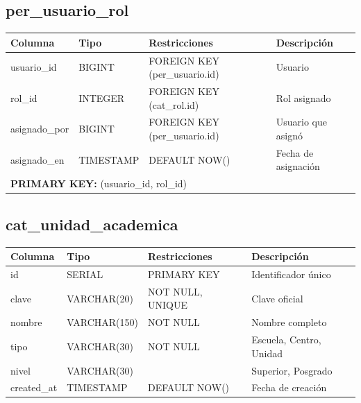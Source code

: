 \documentclass[12pt, a4paper]{article}
\begin{document}
\subsection{per\_usuario\_rol}
\begin{longtable}{|p{3.5cm}|p{2.5cm}|p{3cm}|p{5cm}|}
    \hline
    \rowcolor[gray]{0.9}
    \textbf{Columna} & \textbf{Tipo} & \textbf{Restricciones} & \textbf{Descripción} \\
    \hline
    usuario\_id & BIGINT & FOREIGN KEY (per\_usuario.id) & Usuario \\
    \hline
    rol\_id & INTEGER & FOREIGN KEY (cat\_rol.id) & Rol asignado \\
    \hline
    asignado\_por & BIGINT & FOREIGN KEY (per\_usuario.id) & Usuario que asignó \\
    \hline
    asignado\_en & TIMESTAMP & DEFAULT NOW() & Fecha de asignación \\
    \hline
    \multicolumn{4}{|p{14cm}|}{\cellcolor[gray]{0.95} \textbf{PRIMARY KEY:} (usuario\_id, rol\_id)} \\
    \hline
\end{longtable}

\subsection{cat\_unidad\_academica}
\begin{longtable}{|p{3.5cm}|p{2.5cm}|p{3cm}|p{5cm}|}
    \hline
    \rowcolor[gray]{0.9}
    \textbf{Columna} & \textbf{Tipo} & \textbf{Restricciones} & \textbf{Descripción} \\
    \hline
    id & SERIAL & PRIMARY KEY & Identificador único \\
    \hline
    clave & VARCHAR(20) & NOT NULL, UNIQUE & Clave oficial \\
    \hline
    nombre & VARCHAR(150) & NOT NULL & Nombre completo \\
    \hline
    tipo & VARCHAR(30) & NOT NULL & Escuela, Centro, Unidad \\
    \hline
    nivel & VARCHAR(30) & & Superior, Posgrado \\
    \hline
    created\_at & TIMESTAMP & DEFAULT NOW() & Fecha de creación \\
    \hline
\end{longtable}

\end{document}

